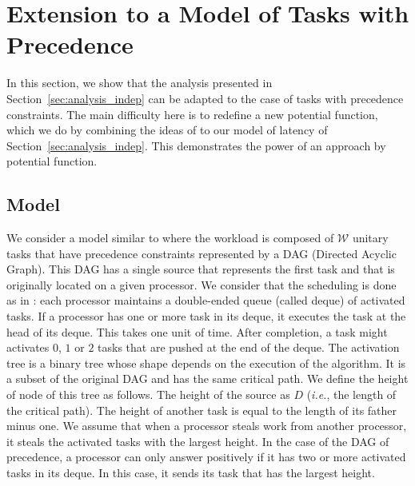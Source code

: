 \section{Extension to a Model of Tasks with Precedence}
\label{sec:dagOfPrecedence}

In this section, we show that the analysis presented in
Section~\ref{sec:analysis_indep} can be adapted to the case of tasks
with precedence constraints. The main difficulty here is to
redefine a new potential function, which we do by combining the ideas
of \cite{Arora2001,Denis2013} to our model of latency of
Section~\ref{sec:analysis_indep}. This demonstrates the power of an
approach by potential function. 

\subsection{Model}

We consider a model similar to \cite{Arora2001,Denis2013} where the
workload is composed of $\mathcal{W}$ unitary tasks that have
precedence constraints represented by a DAG (Directed Acyclic Graph). 
This DAG has a single source that represents the first task and that
is originally located on a given processor.
We consider that the scheduling is done as in
\cite{Arora2001}: each processor maintains a double-ended queue
(called deque) of activated tasks. If a processor has one or more task
in its deque, it executes the task at the head of its deque. This
takes one unit of time. After completion, a task might activates $0$,
$1$ or $2$ tasks that are pushed at the end of the deque.  The
activation tree is a binary tree whose shape depends on the execution
of the algorithm. It is a subset of the original DAG and has the same
critical path.  We define the height of node of this tree as
follows. The height of the source as $D$ (\emph{i.e.}, the length of
the critical path). The height of another task is equal to the length
of its father minus one.  We assume that when a processor steals work
from another processor, it steals the activated tasks with the largest
height.  In the case of the DAG of precedence, a processor can only
answer positively if it has two or more activated tasks in its deque.
In this case, it sends its task that has the largest height.

